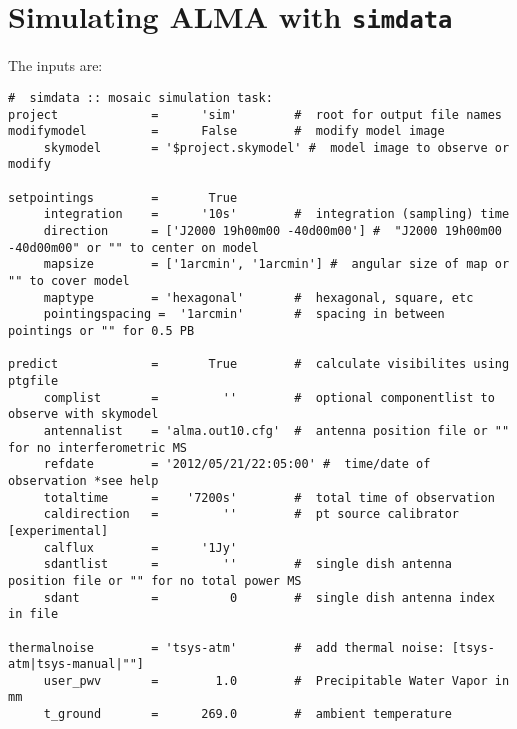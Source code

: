
\section{Simulating ALMA with {\tt simdata}}
\label{section:sim.almasimmos}

The inputs are:
\small
\begin{verbatim}
#  simdata :: mosaic simulation task:
project             =      'sim'        #  root for output file names
modifymodel         =      False        #  modify model image
     skymodel       = '$project.skymodel' #  model image to observe or modify

setpointings        =       True        
     integration    =      '10s'        #  integration (sampling) time
     direction      = ['J2000 19h00m00 -40d00m00'] #  "J2000 19h00m00 -40d00m00" or "" to center on model
     mapsize        = ['1arcmin', '1arcmin'] #  angular size of map or "" to cover model
     maptype        = 'hexagonal'       #  hexagonal, square, etc
     pointingspacing =  '1arcmin'       #  spacing in between pointings or "" for 0.5 PB

predict             =       True        #  calculate visibilites using ptgfile
     complist       =         ''        #  optional componentlist to observe with skymodel
     antennalist    = 'alma.out10.cfg'  #  antenna position file or "" for no interferometric MS
     refdate        = '2012/05/21/22:05:00' #  time/date of observation *see help
     totaltime      =    '7200s'        #  total time of observation
     caldirection   =         ''        #  pt source calibrator [experimental]
     calflux        =      '1Jy'        
     sdantlist      =         ''        #  single dish antenna position file or "" for no total power MS
     sdant          =          0        #  single dish antenna index in file

thermalnoise        = 'tsys-atm'        #  add thermal noise: [tsys-atm|tsys-manual|""]
     user_pwv       =        1.0        #  Precipitable Water Vapor in mm
     t_ground       =      269.0        #  ambient temperature


\end{verbatim}
